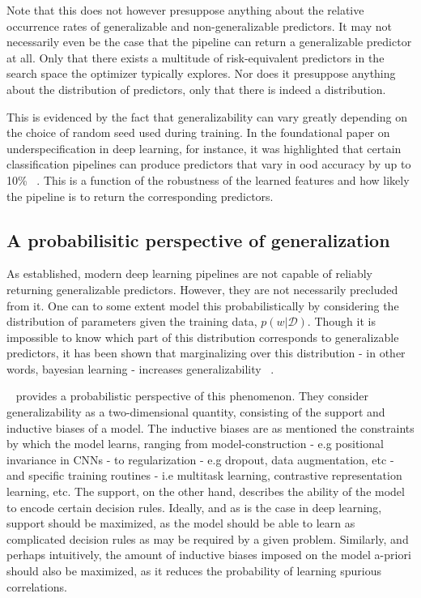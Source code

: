 	Note that this does not however presuppose anything about the relative occurrence rates of generalizable and non-generalizable predictors. It may not necessarily even be the case that the pipeline can return a generalizable predictor at all. Only that there exists a multitude of risk-equivalent predictors in the search space the optimizer typically explores. Nor does it presuppose anything about the distribution of predictors, only that there is indeed a distribution. 

	This is evidenced by the fact that generalizability can vary greatly depending on the choice of random seed used during training. In the foundational paper on underspecification in deep learning, for instance, it was highlighted that certain classification pipelines can produce predictors that vary in ood accuracy by up to 10\% ~\cite{damour2020underspecification}. This is a function of the robustness of the learned features and how likely the pipeline is to return the corresponding predictors. 
	\subsection{A probabilisitic perspective of generalization}
	As established, modern deep learning pipelines are not capable of reliably returning generalizable predictors. However, they are not necessarily precluded from it. One can to some extent model this probabilistically by considering the distribution of parameters given the training data, \(p(w | \mathcal{D})\). Though it is impossible to know which part of this distribution corresponds to generalizable predictors, it has been shown that marginalizing over this distribution - in other words, bayesian learning - increases generalizability ~\cite{bayesian_generalization,endoensemble,divergentnets,ensemble_machinereading}. 

	~\cite{bayesian_generalization} provides a probabilistic perspective of this phenomenon. They consider generalizability as a two-dimensional quantity, consisting of the support and inductive biases of a model. The inductive biases are as mentioned the constraints by which the model learns, ranging from model-construction - e.g positional invariance in CNNs - to regularization - e.g dropout, data augmentation, etc - and specific training routines - i.e multitask learning, contrastive representation learning, etc. The support, on the other hand, describes the ability of the model to encode certain decision rules. Ideally, and as is the case in deep learning, support should be maximized, as the model should be able to learn as complicated decision rules as may be required by a given problem. Similarly, and perhaps intuitively, the amount of inductive biases imposed on the model a-priori should also be maximized, as it reduces the probability of learning spurious correlations. 

